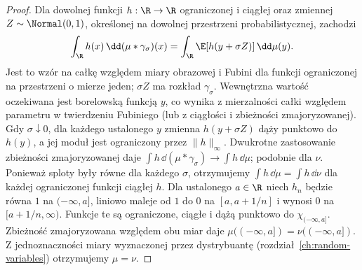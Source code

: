 \begin{proof}
Dla dowolnej funkcji $h:\R\to\R$ ograniczonej i ciągłej
oraz zmiennej $Z\sim\Normal(0,1)$, określonej na dowolnej
przestrzeni probabilistycznej, zachodzi
\[
\int_\R h(x)\,\dd(\mu*\gamma_\sigma)(x)
=\int_\R\E[h(y+\sigma Z)]\,\dd\mu(y).
\]
Jest to wzór na całkę względem miary obrazowej i Fubini
dla funkcji ograniczonej na przestrzeni o mierze jeden;
$\sigma Z$ ma rozkład $\gamma_\sigma$. Wewnętrzna
wartość oczekiwana jest borelowską funkcją $y$,
co wynika z mierzalności całki względem parametru
w twierdzeniu Fubiniego (lub z ciągłości i zbieżności
zmajoryzowanej).
Gdy $\sigma\downarrow0$, dla każdego ustalonego $y$
zmienna $h(y+\sigma Z)$ dąży punktowo do $h(y)$,
a jej moduł jest ograniczony przez $\|h\|_\infty$.
Dwukrotne zastosowanie zbieżności zmajoryzowanej daje
$\int h\,\dd(\mu*\gamma_\sigma)\to\int h\,\dd\mu$;
podobnie dla $\nu$. Ponieważ sploty były równe dla
każdego $\sigma$, otrzymujemy
$\int h\,\dd\mu=\int h\,\dd\nu$ dla każdej
ograniczonej funkcji ciągłej $h$. Dla ustalonego $a\in\R$ niech $h_n$ będzie równa $1$
na $(-\infty,a]$, liniowo maleje od $1$ do $0$ na
$[a,a+1/n]$ i wynosi $0$ na $[a+1/n,\infty)$.
Funkcje te są ograniczone, ciągłe i dążą punktowo
do $\chi_{(-\infty,a]}$. Zbieżność zmajoryzowana
względem obu miar daje $\mu((-\infty,a])=\nu((-\infty,a])$.
Z jednoznaczności miary wyznaczonej przez dystrybuantę
(rozdział~\ref{ch:random-variables}) otrzymujemy $\mu=\nu$.
\end{proof}


